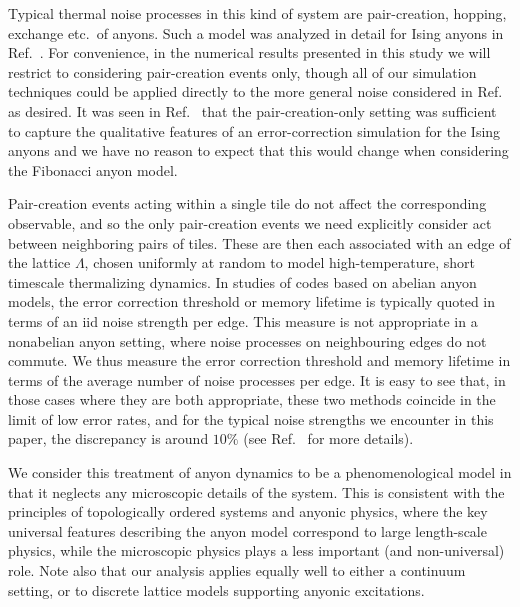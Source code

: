 \documentclass[aps, prl, letterpaper, twocolumn, superscriptaddress, notitlepage, 10pt]{revtex4-1}
\begin{document}
Typical thermal noise processes in this kind of system are 
pair-creation, hopping, exchange etc.~of anyons. Such a model was analyzed in detail for Ising anyons in Ref.~\cite{Brell2013}.
For convenience, in the numerical results presented in this study we will restrict to considering pair-creation events only, though all of our simulation techniques could be applied directly to the more general noise considered in Ref.~\cite{Brell2013} as desired. It was seen in Ref.~\cite{Brell2013} that the pair-creation-only setting was sufficient to capture the qualitative features of an error-correction simulation for the Ising anyons and we have no reason to expect that this would change when considering the Fibonacci anyon model. 

Pair-creation events acting within a single tile do not affect the corresponding observable, and so the only pair-creation events we need explicitly consider act between neighboring pairs of tiles. These are then each associated with an edge of the lattice $\Lambda$, chosen 
uniformly at random to model high-temperature, short timescale thermalizing dynamics.
In studies of codes based on abelian anyon models, the error correction threshold or memory lifetime is typically quoted in terms of an iid noise strength per edge. This measure is not appropriate in a nonabelian anyon setting, where noise processes on neighbouring edges do not commute. We thus measure the error correction threshold and memory lifetime in terms of the average number of noise processes per edge. 
It is easy to see that, in those cases where they are both appropriate, these two methods coincide in the limit of low error rates, and for the typical noise strengths we encounter in this paper, the discrepancy is around $10\%$ (see Ref.~\cite{Brell2013} for more details). 

We consider this treatment of anyon dynamics to be a phenomenological model in that
it neglects any microscopic details of the system.
This is consistent with the principles of topologically 
ordered systems and anyonic physics, where the key universal features describing the 
anyon model correspond to large length-scale physics, while the microscopic physics plays 
a less important (and non-universal) role. Note also that our analysis applies equally well to either a continuum setting, or to discrete lattice models supporting anyonic excitations.
\end{document}
